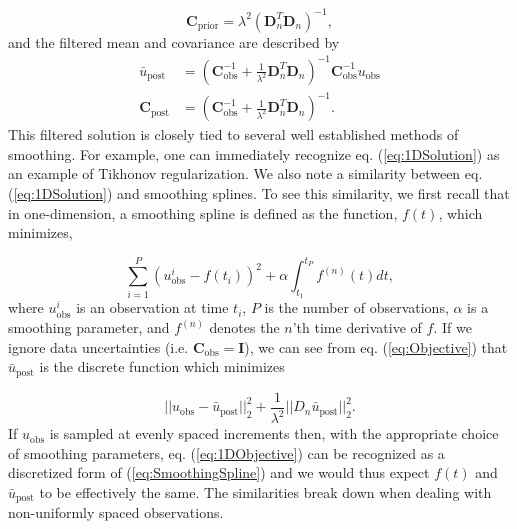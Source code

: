 \documentclass[10pt,a4paper]{article}
\begin{document}
\begin{equation}\label{eq:ExplicitPrior1D}
\mathbf{C_\mathrm{prior}} = \lambda^2(\mathbf{D}_n^T\mathbf{D}_n)^{-1},
\end{equation}
and the filtered mean and covariance are described by
\begin{equation}\label{eq:1DSolution}
\begin{split}
\bar{u}_\mathrm{post} &= (\mathbf{C}_\mathrm{obs}^{-1} +   
                   \frac{1}{\lambda^2}\mathbf{D}_n^T\mathbf{D}_n)^{-1}\mathbf{C}_\mathrm{obs}^{-1}
                   u_\mathrm{obs}
\\
\mathbf{C}_\mathrm{post} &= (\mathbf{C}_\mathrm{obs}^{-1} +   
                            \frac{1}{\lambda^2}\mathbf{D}_n^T\mathbf{D}_n)^{-1}.
\end{split}
\end{equation}
This filtered solution is closely tied to several well established methods of smoothing.  For example, one can immediately recognize eq. (\ref{eq:1DSolution}) as an example of Tikhonov regularization. We also note a similarity between eq. (\ref{eq:1DSolution}) and smoothing splines.  To see this similarity, we first recall that in one-dimension, a smoothing spline is defined as the function, $f(t)$, which minimizes,

\begin{equation}\label{eq:SmoothingSpline}
\sum_{i=1}^P (u_\mathrm{obs}^i - f(t_i))^2 + \alpha \int_{t_1}^{t_P} f^{(n)}(t) dt,
\end{equation}
where $u_\mathrm{obs}^i$ is an observation at time $t_i$, $P$ is the number of observations, $\alpha$ is a smoothing parameter, and $f^{(n)}$ denotes the $n$'th time derivative of $f$.
If we ignore data uncertainties (i.e. $\mathbf{C}_\mathrm{obs}=\mathbf{I}$), we can see from eq. (\ref{eq:Objective}) that $\bar{u}_\mathrm{post}$ is the discrete function which minimizes  

\begin{equation}\label{eq:1DObjective}
||u_\mathrm{obs} - \bar{u}_\mathrm{post}||_2^2 + \frac{1}{\lambda^2}||D_n\bar{u}_\mathrm{post}||_2^2.
\end{equation} 
If $u_\mathrm{obs}$ is sampled at evenly spaced increments then, with the appropriate choice of smoothing parameters, eq. (\ref{eq:1DObjective}) can be recognized as a discretized form of (\ref{eq:SmoothingSpline}) and we would thus expect $f(t)$ and $\bar{u}_\mathrm{post}$ to be effectively the same. The similarities break down when dealing with non-uniformly spaced observations.  
\end{document}
